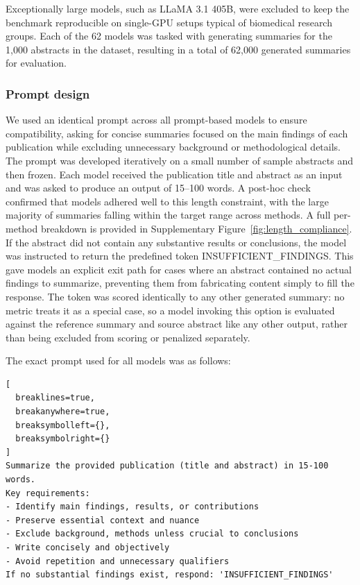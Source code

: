Exceptionally large models, such as LLaMA 3.1 405B, were excluded to keep the benchmark reproducible on single-GPU setups typical of biomedical research groups. Each of the 62 models was tasked with generating summaries for the 1,000 abstracts in the dataset, resulting in a total of 62,000 generated summaries for evaluation.

\subsubsection{Prompt design}

We used an identical prompt across all prompt-based models to ensure compatibility, asking for concise summaries focused on the main findings of each publication while excluding unnecessary background or methodological details. The prompt was developed iteratively on a small number of sample abstracts and then frozen. Each model received the publication title and abstract as an input and was asked to produce an output of 15--100 words. A post-hoc check confirmed that models adhered well to this length constraint, with the large majority of summaries falling within the target range across methods. A full per-method breakdown is provided in Supplementary Figure~\ref{fig:length_compliance}. If the abstract did not contain any substantive results or conclusions, the model was instructed to return the predefined token INSUFFICIENT\_FINDINGS. This gave models an explicit exit path for cases where an abstract contained no actual findings to summarize, preventing them from fabricating content simply to fill the response. The token was scored identically to any other generated summary: no metric treats it as a special case, so a model invoking this option is evaluated against the reference summary and source abstract like any other output, rather than being excluded from scoring or penalized separately.

The exact prompt used for all models was as follows:

\begin{nolinenumbers}
\begin{Verbatim}[
  breaklines=true,
  breakanywhere=true,
  breaksymbolleft={},
  breaksymbolright={}
]
Summarize the provided publication (title and abstract) in 15-100 words.
Key requirements:
- Identify main findings, results, or contributions
- Preserve essential context and nuance
- Exclude background, methods unless crucial to conclusions
- Write concisely and objectively
- Avoid repetition and unnecessary qualifiers
If no substantial findings exist, respond: 'INSUFFICIENT_FINDINGS'
\end{Verbatim}
\end{nolinenumbers}

